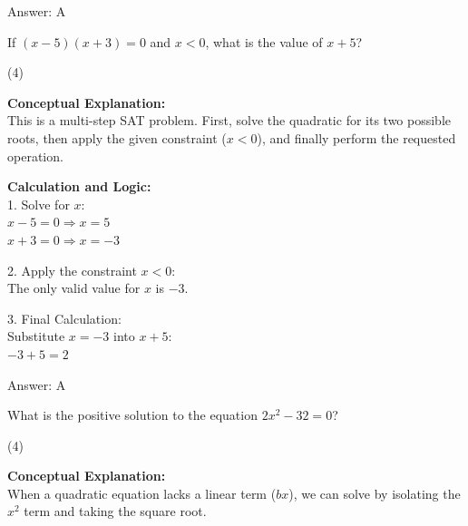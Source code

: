 \documentclass[11pt,paper=a4,answers]{exam}
\begin{document}
\begin{questions}
\begin{solution}
\vspace{20pt}

Answer: \colorbox{yellow!100}{A}
\end{solution}

\vspace{30pt}

\question
If $(x - 5)(x + 3) = 0$ and $x < 0$, what is the value of $x + 5$?
\begin{tasks}(4)
\end{tasks}

\begin{solution}
\textbf{Conceptual Explanation:} \\
This is a multi-step SAT problem. First, solve the quadratic for its two possible roots, then apply the given constraint ($x < 0$), and finally perform the requested operation.

\vspace{15pt}

\textbf{Calculation and Logic:} \\
1. Solve for $x$: \\
   $x - 5 = 0 \Rightarrow x = 5$ \\
   $x + 3 = 0 \Rightarrow x = -3$

\vspace{10pt}

2. Apply the constraint $x < 0$: \\
   The only valid value for $x$ is $-3$.

\vspace{10pt}

3. Final Calculation: \\
   Substitute $x = -3$ into $x + 5$: \\
   $-3 + 5 = 2$

\vspace{20pt}

Answer: \colorbox{yellow!100}{A}
\end{solution}

\question
What is the positive solution to the equation $2x^2 - 32 = 0$?
\begin{tasks}(4)
\end{tasks}

\begin{solution}
\textbf{Conceptual Explanation:} \\
When a quadratic equation lacks a linear term ($bx$), we can solve by isolating the $x^2$ term and taking the square root.


\end{solution}
\end{questions}
\end{document}
